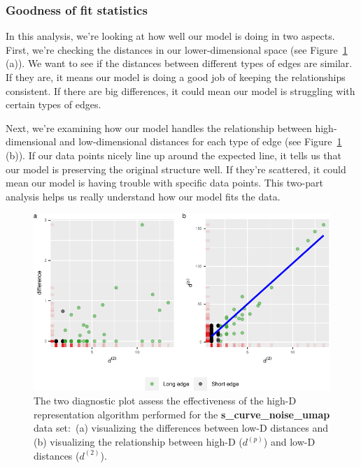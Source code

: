\documentclass[
  12pt]{article}
\begin{document}
\hypertarget{goodness-of-fit-statistics}{%
\subsubsection{Goodness of fit
statistics}\label{goodness-of-fit-statistics}}

In this analysis, we're looking at how well our model is doing in two
aspects. First, we're checking the distances in our lower-dimensional
space (see Figure~\ref{fig-diag} (a)). We want to see if the distances
between different types of edges are similar. If they are, it means our
model is doing a good job of keeping the relationships consistent. If
there are big differences, it could mean our model is struggling with
certain types of edges.

Next, we're examining how our model handles the relationship between
high-dimensional and low-dimensional distances for each type of edge
(see Figure~\ref{fig-diag} (b)). If our data points nicely line up
around the expected line, it tells us that our model is preserving the
original structure well. If they're scattered, it could mean our model
is having trouble with specific data points. This two-part analysis
helps us really understand how our model fits the data.

\begin{figure}

{\centering \includegraphics[width=1\textwidth,height=\textheight]{paper_files/figure-pdf/fig-diag-1.pdf}

}

\caption{\label{fig-diag}The two diagnostic plot assess the
effectiveness of the high-D representation algorithm performed for the
\textbf{s\_curve\_noise\_umap} data set\(\colon\) (a) visualizing the
differences between low-D distances and (b) visualizing the relationship
between high-D (\(d^{(p)}\)) and low-D distances (\(d^{(2)}\)).}

\end{figure}
\end{document}
